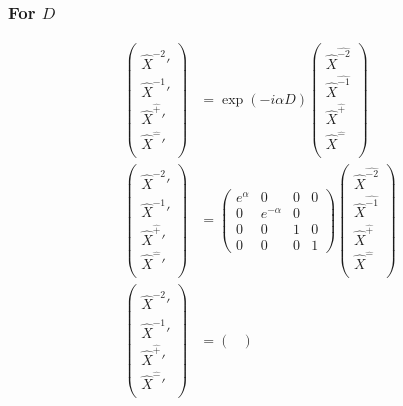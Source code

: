 \documentclass[]{article}
\numberwithin{equation}{section}
\begin{document}
{{\subsubsection{For $D$}
\begin{align}
\begin{pmatrix}
    \hat{X}^{\hat{-2}}'\\
    \hat{X}^{\hat{-1}}'\\
    \hat{X}^{\hat{+}}'\\
    \hat{X}^{\hat{-}}'\\
    \end{pmatrix}&= \exp{(-i\alpha D)}\begin{pmatrix}
    \hat{X}^{\hat{-2}}\\
    \hat{X}^{\hat{-1}}\\
    \hat{X}^{\hat{+}}\\
    \hat{X}^{\hat{-}}\\
    \end{pmatrix}\\
    \begin{pmatrix}
    \hat{X}^{\hat{-2}}'\\
    \hat{X}^{\hat{-1}}'\\
    \hat{X}^{\hat{+}}'\\
    \hat{X}^{\hat{-}}'\\
    \end{pmatrix}&= \begin{pmatrix}
        e^{\alpha}&0&0&0\\
        0&e^{-\alpha}&0&\\
        0&0&1&0\\
        0&0&0&1
    \end{pmatrix}\begin{pmatrix}
    \hat{X}^{\hat{-2}}\\
    \hat{X}^{\hat{-1}}\\
    \hat{X}^{\hat{+}}\\
    \hat{X}^{\hat{-}}\\
    \end{pmatrix}\\
    \begin{pmatrix}
    \hat{X}^{\hat{-2}}'\\
    \hat{X}^{\hat{-1}}'\\
    \hat{X}^{\hat{+}}'\\
    \hat{X}^{\hat{-}}'\\
    \end{pmatrix}&= \begin{pmatrix}

\end{pmatrix}
\end{align}}}
\end{document}
